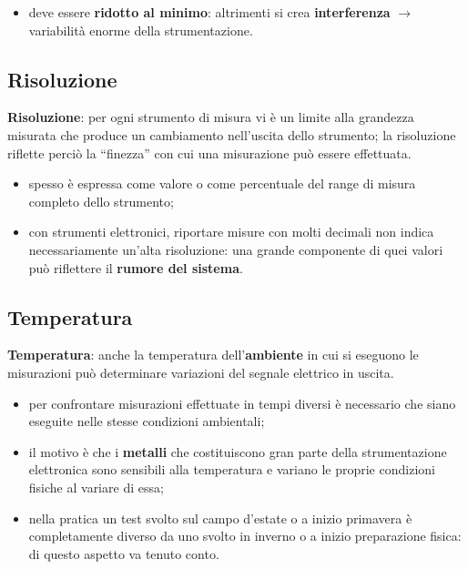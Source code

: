 \begin{itemize}
  \item deve essere \textbf{ridotto al minimo}: altrimenti si crea \textbf{interferenza}
    $\rightarrow$ variabilità enorme della strumentazione.
\end{itemize}

\subsection{Risoluzione}

\textbf{Risoluzione}: per ogni strumento di misura vi è un limite alla grandezza misurata che
produce un cambiamento nell'uscita dello strumento; la risoluzione riflette perciò la ``finezza''
con cui una misurazione può essere effettuata.

\begin{itemize}
  \item spesso è espressa come valore o come percentuale del range di misura completo dello
    strumento;
  \item con strumenti elettronici, riportare misure con molti decimali non indica necessariamente
    un'alta risoluzione: una grande componente di quei valori può riflettere il \textbf{rumore del
    sistema}.
\end{itemize}

\subsection{Temperatura}

\textbf{Temperatura}: anche la temperatura dell'\textbf{ambiente} in cui si eseguono le misurazioni
può determinare variazioni del segnale elettrico in uscita.

\begin{itemize}
  \item per confrontare misurazioni effettuate in tempi diversi è necessario che siano eseguite
    nelle stesse condizioni ambientali;
  \item il motivo è che i \textbf{metalli} che costituiscono gran parte della strumentazione
    elettronica sono sensibili alla temperatura e variano le proprie condizioni fisiche al variare
    di essa;
  \item nella pratica un test svolto sul campo d'estate o a inizio primavera è completamente diverso
    da uno svolto in inverno o a inizio preparazione fisica: di questo aspetto va tenuto conto.
\end{itemize}

